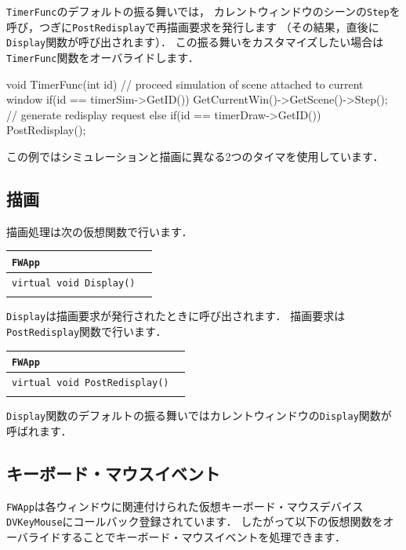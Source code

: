 \texttt{TimerFunc}のデフォルトの振る舞いでは，
\KLUDGE カレントウィンドウのシーンの\texttt{Step}を呼び，つぎに\texttt{PostRedisplay}で再描画要求を発行します
\KLUDGE （その結果，直後に\texttt{Display}関数が呼び出されます）．
\KLUDGE この振る舞いをカスタマイズしたい場合は\texttt{TimerFunc}関数をオーバライドします．
\begin{sourcecode}
void TimerFunc(int id){
    // proceed simulation of scene attached to current window
    if(id == timerSim->GetID()){
        GetCurrentWin()->GetScene()->Step();
    }
    // generate redisplay request
    else if(id == timerDraw->GetID()){
        PostRedisplay();
    }
}
\end{sourcecode}
\KLUDGE この例ではシミュレーションと描画に異なる2つのタイマを使用しています．

\subsection*{描画}

\KLUDGE 描画処理は次の仮想関数で行います．

\noindent
\begin{tabular}{p{.7\hsize}p{.2\hsize}}
\\
\texttt{FWApp}						\\ \midrule
\texttt{virtual void Display()}	&	\\
\\
\end{tabular}

\texttt{Display}は描画要求が発行されたときに呼び出されます．
\KLUDGE 描画要求は\texttt{PostRedisplay}関数で行います．

\noindent
\begin{tabular}{p{.7\hsize}p{.2\hsize}}
\\
\texttt{FWApp}							\\ \midrule
\texttt{virtual void PostRedisplay()}	&	\\
\\
\end{tabular}

\texttt{Display}関数のデフォルトの振る舞いではカレントウィンドウの\texttt{Display}関数が呼ばれます．

\subsection*{キーボード・マウスイベント}

\texttt{FWApp}は各ウィンドウに関連付けられた仮想キーボード・マウスデバイス\texttt{DVKeyMouse}にコールバック登録されています．
\KLUDGE したがって以下の仮想関数をオーバライドすることでキーボード・マウスイベントを処理できます．

